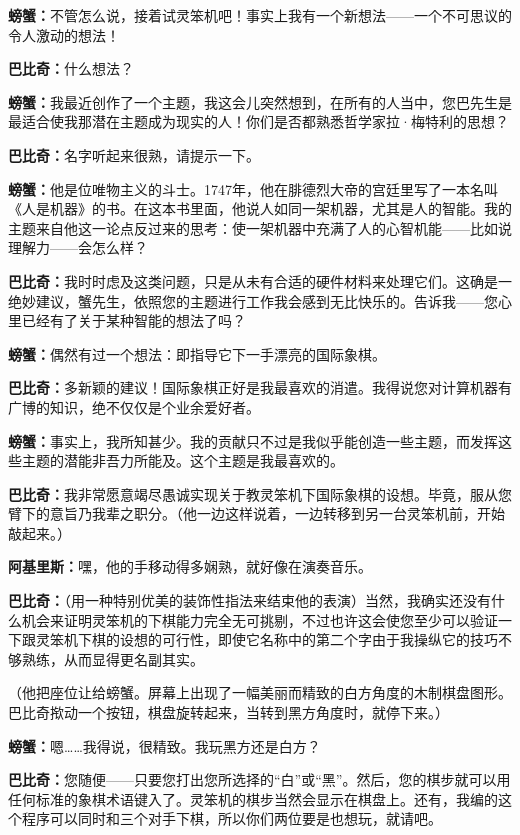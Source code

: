 \documentclass[
  12pt,
  twoside,
  openright,
  oldfontcommands,
]{memoir}
\newcommand{\kaitismall}[1]{{\kaitifamily\small #1}}
\newcommand{\dialogname}[1]{{\sffamily\bfseries #1}}
\begin{document}
\dialogname{螃蟹：}不管怎么说，接着试灵笨机吧！事实上我有一个新想法------一个不可思议的令人激动的想法！

\dialogname{巴比奇：}什么想法？

\dialogname{螃蟹：}我最近创作了一个主题，我这会儿突然想到，在所有的人当中，您巴先生是最适合使我那潜在主题成为现实的人！你们是否都熟悉哲学家拉·梅特利的思想？

\dialogname{巴比奇：}名字听起来很熟，请提示一下。

\dialogname{螃蟹：}他是位唯物主义的斗士。1747年，他在腓德烈大帝的宫廷里写了一本名叫《人是机器》的书。在这本书里面，他说人如同一架机器，尤其是人的智能。我的主题来自他这一论点反过来的思考：使一架机器中充满了人的心智机能------比如说理解力------会怎么样？

\dialogname{巴比奇：}我时时虑及这类问题，只是从未有合适的硬件材料来处理它们。这确是一绝妙建议，蟹先生，依照您的主题进行工作我会感到无比快乐的。告诉我------您心里已经有了关于某种智能的想法了吗？

\dialogname{螃蟹：}偶然有过一个想法：即指导它下一手漂亮的国际象棋。

\dialogname{巴比奇：}多新颖的建议！国际象棋正好是我最喜欢的消遣。我得说您对计算机器有广博的知识，绝不仅仅是个业余爱好者。

\dialogname{螃蟹：}事实上，我所知甚少。我的贡献只不过是我似乎能创造一些主题，而发挥这些主题的潜能非吾力所能及。这个主题是我最喜欢的。

\dialogname{巴比奇：}我非常愿意竭尽愚诚实现关于教灵笨机下国际象棋的设想。毕竟，服从您臂下的意旨乃我辈之职分。\kaitismall{（他一边这样说着，一边转移到另一台灵笨机前，开始敲起来。）}

\dialogname{阿基里斯：}嘿，他的手移动得多娴熟，就好像在演奏音乐。

\dialogname{巴比奇：}\kaitismall{（用一种特别优美的装饰性指法来结束他的表演）}当然，我确实还没有什么机会来证明灵笨机的下棋能力完全无可挑剔，不过也许这会使您至少可以验证一下跟灵笨机下棋的设想的可行性，即使它名称中的第二个字由于我操纵它的技巧不够熟练，从而显得更名副其实。

（他把座位让给螃蟹。屏幕上出现了一幅美丽而精致的白方角度的木制棋盘图形。巴比奇揿动一个按钮，棋盘旋转起来，当转到黑方角度时，就停下来。）

\dialogname{螃蟹：}嗯\ldots\ldots 我得说，很精致。我玩黑方还是白方？

\dialogname{巴比奇：}您随便------只要您打出您所选择的``白''或``黑''。然后，您的棋步就可以用任何标准的象棋术语键入了。灵笨机的棋步当然会显示在棋盘上。还有，我编的这个程序可以同时和三个对手下棋，所以你们两位要是也想玩，就请吧。
\end{document}
